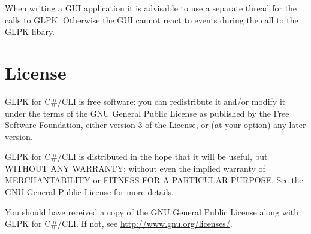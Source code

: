 \documentclass[a4paper,11pt]{report}
\begin{document}
When writing a GUI application it is advisable to use a separate thread for
the calls to GLPK. Otherwise the GUI cannot react to events during the call
to the GLPK libary.

\chapter{License}
GLPK for C\#/CLI is free software: you can redistribute it and/or
modify it under the terms of the GNU General Public License\cite{GPL} as
published by the Free Software Foundation, either version 3 of the
License, or (at your option) any later version.

GLPK for C\#/CLI is distributed in the hope that it will be useful, but
WITHOUT ANY WARRANTY; without even the implied warranty of
MERCHANTABILITY or FITNESS FOR A PARTICULAR PURPOSE. See the GNU
General Public License for more details.

You should have received a copy of the GNU General Public License
along with GLPK for C\#/CLI. If not, see
\href{http://www.gnu.org/licenses/}{http://www.gnu.org/licenses/}.



\newpage
\printindex
\end{document}
